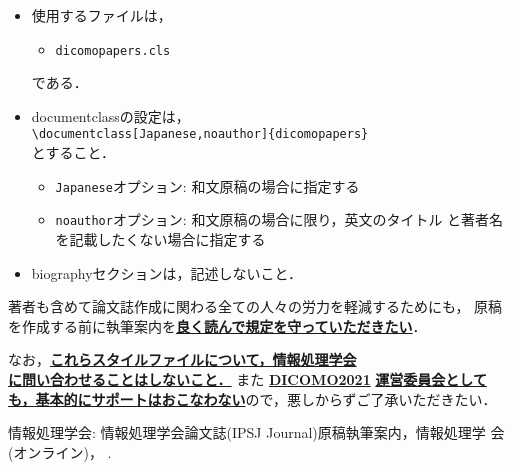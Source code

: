 \documentclass[Japanese]{dicomopapers}
\def\|{\verb|}
\begin{document}
\begin{itemize}%{
  \item 使用するファイルは，
        \begin{itemize}%{
          \item[]\tt dicomopapers.cls
        \end{itemize}%}
        である．
  \item documentclassの設定は，\\
        \|\documentclass[Japanese,noauthor]{dicomopapers}|\\
        とすること．
        \begin{itemize}
          \item {\tt Japanese}オプション: 和文原稿の場合に指定する
          \item {\tt noauthor}オプション: 和文原稿の場合に限り，英文のタイトル
                と著者名を記載したくない場合に指定する
        \end{itemize}
  \item biographyセクションは，記述しないこと．
\end{itemize}%

著者も含めて論文誌作成に関わる全ての人々の労力を軽減するためにも，
原稿を作成する前に執筆案内を\underline{\bf{良く読んで規定を守っていただきたい}}．

なお，\underline{\bf これらスタイルファイルについて，情報処理学会}\\
\underline{\bf に問い合わせることはしないこと．} また
\underline{\bf DICOMO2021}
\underline{\bf 運営委員会としても，基本的にサポートはおこなわない}ので，悪しからずご了承いただきたい．

\begin{thebibliography}{10}
  情報処理学会: 情報処理学会論文誌(IPSJ Journal)原稿執筆案内，情報処理学
  会(オンライン)，
  .
\end{thebibliography}
\end{document}
